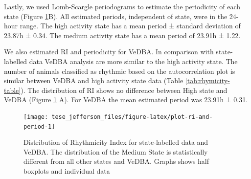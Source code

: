 \documentclass[english,msc,numbers,hidelinks]{coppe}
\begin{document}
  Lastly, we used Lomb-Scargle periodograms to estimate the periodicity of each state (Figure \ref{fig:plot-ri-and-period}B). All estimated periods, independent of state, were in the 24-hour range. The high activity state has a mean period ± standard deviation of 23.87h ± 0.34. The medium activity state has a mean period of 23.91h ± 1.22.

  We also estimated RI and periodicity for VeDBA. In comparison with state-labelled data VeDBA analysis are more similar to the high activity state. The number of animals classified as rhythmic based on the autocorrelation plot is similar between VeDBA and high activity state data (Table \ref{tab:rhymicity-table}). The distribution of RI shows no difference between High state and VeDBA (Figure \ref{fig:plot-ri-and-period} A). For VeDBA the mean estimated period was 23.91h ± 0.31.
  \begin{figure}[H]

  {\centering \texttt{[image: tese\_jefferson\_files/figure-latex/plot-ri-and-period-1]} 

  }

  \caption{Distribution of Rhythmicity Index for state-labelled data and VeDBA. The distribution of the Medium State is statistically different from all other states and VeDBA. Graphs shows half boxplots and individual data}\label{fig:plot-ri-and-period}
  \end{figure}
  \newpage
\end{document}
